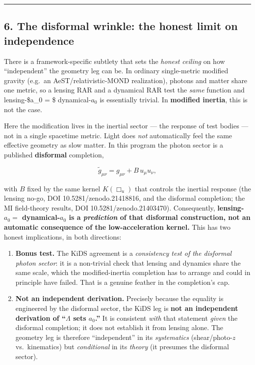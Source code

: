 \documentclass[
]{article}
\providecommand{\tightlist}{%
  \setlength{\itemsep}{0pt}\setlength{\parskip}{0pt}}
\begin{document}
\begin{center}\rule{0.5\linewidth}{0.5pt}\end{center}

\subsection{6. The disformal wrinkle: the honest limit on
independence}\label{the-disformal-wrinkle-the-honest-limit-on-independence}

There is a framework-specific subtlety that sets the \emph{honest
ceiling} on how ``independent'' the geometry leg can be. In ordinary
single-metric modified gravity (e.g.~an AeST/relativistic-MOND
realization), photons and matter share one metric, so a lensing RAR and
a dynamical RAR test the \emph{same} function and lensing-\$a\_0 = \$
dynamical-\(a_0\) is essentially trivial. In \textbf{modified inertia},
this is not the case.

Here the modification lives in the inertial sector --- the response of
test bodies --- not in a single spacetime metric. Light does \emph{not}
automatically feel the same effective geometry as slow matter. In this
program the photon sector is a published \textbf{disformal} completion,

\[
\tilde g_{\mu\nu} = g_{\mu\nu} + B\,u_\mu u_\nu,
\]

with \(B\) fixed by the same kernel \(K(\Box_u)\) that controls the
inertial response (the lensing no-go, DOI 10.5281/zenodo.21418816, and
the disformal completion; the MI field-theory results, DOI
10.5281/zenodo.21403470). Consequently, \textbf{lensing-\(a_0 =\)
dynamical-\(a_0\) is a \emph{prediction} of that disformal construction,
not an automatic consequence of the low-acceleration kernel.} This has
two honest implications, in both directions:

\begin{enumerate}
\def\labelenumi{\arabic{enumi}.}
\tightlist
\item
  \textbf{Bonus test.} The KiDS agreement is a \emph{consistency test of
  the disformal photon sector}: it is a non-trivial check that lensing
  and dynamics share the same scale, which the modified-inertia
  completion has to arrange and could in principle have failed. That is
  a genuine feather in the completion's cap.
\item
  \textbf{Not an independent derivation.} Precisely because the equality
  is engineered by the disformal sector, the KiDS leg is \textbf{not an
  independent derivation of ``\(\Lambda\) sets \(a_0\).''} It is
  consistent \emph{with} that statement \emph{given} the disformal
  completion; it does not establish it from lensing alone. The geometry
  leg is therefore ``independent'' in its \emph{systematics}
  (shear/photo-\(z\) vs.~kinematics) but \emph{conditional} in its
  \emph{theory} (it presumes the disformal sector).
\end{enumerate}
\end{document}
